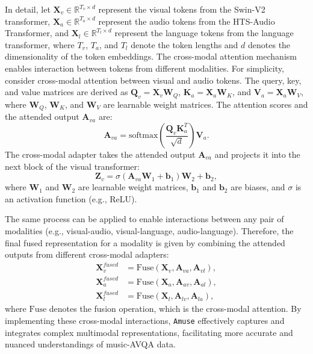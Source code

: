 \documentclass[11pt]{article}
\begin{document}
In detail, let $\mathbf{X}_v \in \mathbb{R}^{T_v \times d}$ represent the visual tokens from the Swin-V2 transformer, $\mathbf{X}_a \in \mathbb{R}^{T_a \times d}$ represent the audio tokens from the HTS-Audio Transformer, and $\mathbf{X}_l \in \mathbb{R}^{T_l \times d}$ represent the language tokens from the language transformer, where $T_v$, $T_a$, and $T_l$ denote the token lengths and $d$ denotes the dimensionality of the token embeddings. The cross-modal attention mechanism enables interaction between tokens from different modalities. For simplicity, consider cross-modal attention between visual and audio tokens. The query, key, and value matrices are derived as $\mathbf{Q}_v = \mathbf{X}_v \mathbf{W}_Q$, $\mathbf{K}_a = \mathbf{X}_a \mathbf{W}_K$, and $\mathbf{V}_a = \mathbf{X}_a \mathbf{W}_V$,
where $\mathbf{W}_Q$, $\mathbf{W}_K$, and $\mathbf{W}_V$ are learnable weight matrices. The attention scores and the attended output $\mathbf{A}_{va}$ are:
\begin{equation}
\mathbf{A}_{va} = \text{softmax}\left(\frac{\mathbf{Q}_v \mathbf{K}_a^T}{\sqrt{d}}\right) \mathbf{V}_a.
\end{equation}
The cross-modal adapter takes the attended output $\mathbf{A}_{va}$ and projects it into the next block of the visual transformer:
\begin{equation}
\mathbf{Z}_v = \sigma(\mathbf{A}_{va} \mathbf{W}_1 + \mathbf{b}_1) \mathbf{W}_2 + \mathbf{b}_2,
\end{equation}
where $\mathbf{W}_1$ and $\mathbf{W}_2$ are learnable weight matrices, $\mathbf{b}_1$ and $\mathbf{b}_2$ are biases, and $\sigma$ is an activation function (e.g., ReLU).

The same process can be applied to enable interactions between any pair of modalities (e.g., visual-audio, visual-language, audio-language). Therefore, the final fused representation for a modality is given by combining the attended outputs from different cross-modal adapters:
\begin{equation}
\begin{aligned}
\mathbf{X}_v^{fused} &= \text{Fuse}(\mathbf{X}_v, \mathbf{A}_{va}, \mathbf{A}_{vl}), \\
\mathbf{X}_a^{fused} &= \text{Fuse}(\mathbf{X}_a, \mathbf{A}_{av}, \mathbf{A}_{al}), \\
\mathbf{X}_l^{fused} &= \text{Fuse}(\mathbf{X}_l, \mathbf{A}_{lv}, \mathbf{A}_{la}),
\end{aligned}
\end{equation}
where $\text{Fuse}$ denotes the fusion operation, which is the cross-modal attention. By implementing these cross-modal interactions, \texttt{Amuse} effectively captures and integrates complex multimodal representations, facilitating more accurate and nuanced understandings of music-AVQA data.
\end{document}
